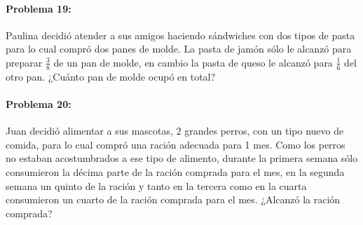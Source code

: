\documentclass[10pt,twoside]{article}
\begin{document}
\paragraph*{Problema 19:} Paulina decidió atender a sus amigos haciendo sándwiches con dos tipos de pasta para lo cual compró dos panes de molde. La pasta de jamón sólo le alcanzó para preparar $\frac{3}{8}$ de un pan de molde, en cambio la pasta de queso le alcanzó para $\frac{1}{6}$ del otro pan. ¿Cuánto pan de molde ocupó en total?
\paragraph*{Problema 20:} Juan decidió alimentar a sus mascotas, 2 grandes perros, con un tipo nuevo de comida, para lo cual compró una ración adecuada para 1 mes. Como los perros no estaban acostumbrados a ese tipo de alimento, durante la primera semana sólo
consumieron la décima parte de la ración comprada
para el mes, en la segunda semana un quinto de la
ración y tanto en la tercera como en la cuarta
consumieron un cuarto de la ración comprada para
el mes. ¿Alcanzó la ración comprada?
\end{document}

